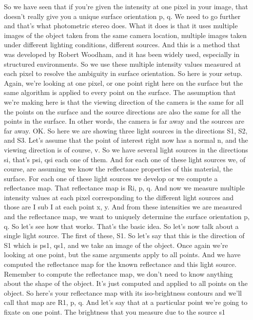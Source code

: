 \documentclass[12pt]{article}
\begin{document}
So we have seen that if you're given the intensity at one
pixel in your image, that doesn't really
give you a unique surface orientation p, q.
We need to go further and that's what photometric stereo does.
What it does is that it uses multiple images
of the object taken from the same camera
location, multiple images taken under different lighting
conditions, different sources.
And this is a method that was developed by Robert Woodham,
and it has been widely used, especially
in structured environments.
So we use these multiple intensity values
measured at each pixel to resolve the ambiguity
in surface orientation.
So here is your setup.
Again, we're looking at one pixel,
or one point right here on the surface
but the same algorithm is applied
to every point on the surface.
The assumption that we're making here
is that the viewing direction of the camera
is the same for all the points on the surface
and the source directions are also
the same for all the points in the surface.
In other words, the camera is far away
and the sources are far away.
OK.
So here we are showing three light sources
in the directions S1, S2, and S3.
Let's assume that the point of interest right now has
a normal n, and the viewing direction
is of course, v. So we have several light sources
in the directions si, that's psi, qsi each one of them.
And for each one of these light sources we, of course,
are assuming we know the reflectance properties
of this material, the surface.
For each one of these light sources
we develop or we compute a reflectance map.
That reflectance map is Ri, p, q.
And now we measure multiple intensity values
at each pixel corresponding to the different light sources
and those are I sub I at each point x, y.
And from these intensities we are measured
and the reflectance map, we want to uniquely determine
the surface orientation p, q.
So let's see how that works.
That's the basic idea.
So let's now talk about a single light source.
The first of these, S1.
So let's say that this is the direction of S1 which
is ps1, qs1, and we take an image of the object.
Once again we're looking at one point,
but the same arguments apply to all points.
And we have computed the reflectance map
for the known reflectance and this light source.
Remember to compute the reflectance map,
we don't need to know anything about the shape of the object.
It's just computed and applied to all points on the object.
So here's your reflectance map with
its iso-brightness contours and we'll call that map are
R1, p, q.
And let's say that at a particular point
we're going to fixate on one point.
The brightness that you measure due to the source s1
\end{document}
